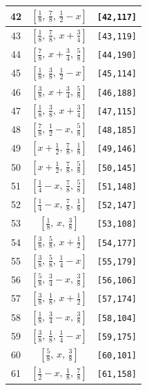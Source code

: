 \documentclass[fleqn,8pt]{jsarticle}
\begin{document}
\begin{longtable}{ccc}
42 & $\left[ \frac{1}{8},\, \frac{7}{8},\, \frac{1}{2} - x \right]$ & {\tt [42,117]} \\ \hline
43 & $\left[ \frac{1}{8},\, \frac{7}{8},\, x + \frac{3}{4} \right]$ & {\tt [43,119]} \\ \hline
44 & $\left[ \frac{7}{8},\, x + \frac{3}{4},\, \frac{5}{8} \right]$ & {\tt [44,190]} \\ \hline
45 & $\left[ \frac{1}{8},\, \frac{3}{8},\, \frac{1}{2} - x \right]$ & {\tt [45,114]} \\ \hline
46 & $\left[ \frac{3}{8},\, x + \frac{3}{4},\, \frac{5}{8} \right]$ & {\tt [46,188]} \\ \hline
47 & $\left[ \frac{1}{8},\, \frac{3}{8},\, x + \frac{3}{4} \right]$ & {\tt [47,115]} \\ \hline
48 & $\left[ \frac{7}{8},\, \frac{1}{2} - x,\, \frac{5}{8} \right]$ & {\tt [48,185]} \\ \hline
49 & $\left[ x + \frac{1}{2},\, \frac{7}{8},\, \frac{1}{8} \right]$ & {\tt [49,146]} \\ \hline
50 & $\left[ x + \frac{1}{2},\, \frac{7}{8},\, \frac{5}{8} \right]$ & {\tt [50,145]} \\ \hline
51 & $\left[ \frac{1}{4} - x,\, \frac{7}{8},\, \frac{5}{8} \right]$ & {\tt [51,148]} \\ \hline
52 & $\left[ \frac{1}{4} - x,\, \frac{7}{8},\, \frac{1}{8} \right]$ & {\tt [52,147]} \\ \hline
53 & $\left[ \frac{1}{8},\, x,\, \frac{3}{8} \right]$ & {\tt [53,108]} \\ \hline
54 & $\left[ \frac{3}{8},\, \frac{5}{8},\, x + \frac{1}{2} \right]$ & {\tt [54,177]} \\ \hline
55 & $\left[ \frac{3}{8},\, \frac{5}{8},\, \frac{1}{4} - x \right]$ & {\tt [55,179]} \\ \hline
56 & $\left[ \frac{5}{8},\, \frac{3}{4} - x,\, \frac{3}{8} \right]$ & {\tt [56,106]} \\ \hline
57 & $\left[ \frac{3}{8},\, \frac{1}{8},\, x + \frac{1}{2} \right]$ & {\tt [57,174]} \\ \hline
58 & $\left[ \frac{1}{8},\, \frac{3}{4} - x,\, \frac{3}{8} \right]$ & {\tt [58,104]} \\ \hline
59 & $\left[ \frac{3}{8},\, \frac{1}{8},\, \frac{1}{4} - x \right]$ & {\tt [59,175]} \\ \hline
60 & $\left[ \frac{5}{8},\, x,\, \frac{3}{8} \right]$ & {\tt [60,101]} \\ \hline
61 & $\left[ \frac{1}{2} - x,\, \frac{1}{8},\, \frac{7}{8} \right]$ & {\tt [61,158]} \\ \hline

\end{longtable}
\end{document}
